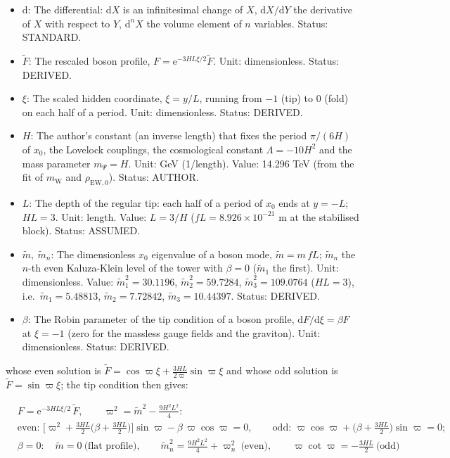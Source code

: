 \documentclass[
  10pt,
]{article}
\providecommand{\tightlist}{%
  \setlength{\itemsep}{0pt}\setlength{\parskip}{0pt}}
\begin{document}
\begin{itemize}
\tightlist
\item
  \(\mathrm{d}\): The differential: \(\mathrm{d}X\) is an infinitesimal
  change of \(X\), \(\mathrm{d}X/\mathrm{d}Y\) the derivative of \(X\)
  with respect to \(Y\), \(\mathrm{d}^nX\) the volume element of \(n\)
  variables. Status: STANDARD.
\item
  \(\tilde F\): The rescaled boson profile,
  \(F = \mathrm{e}^{-3HL\xi/2}\tilde F\). Unit: dimensionless. Status:
  DERIVED.
\item
  \(\xi\): The scaled hidden coordinate, \(\xi = y/L\), running from
  \(-1\) (tip) to \(0\) (fold) on each half of a period. Unit:
  dimensionless. Status: DERIVED.
\item
  \(H\): The author's constant (an inverse length) that fixes the period
  \(\pi/(6H)\) of \(x_0\), the Lovelock couplings, the cosmological
  constant \(\Lambda = -10H^2\) and the mass parameter \(m_\Psi = H\).
  Unit: GeV (1/length). Value: 14.296 TeV (from the fit of
  \(m_{\mathrm{W}}\) and \(\rho_{\mathrm{EW},0}\)). Status: AUTHOR.
\item
  \(L\): The depth of the regular tip: each half of a period of \(x_0\)
  ends at \(y = -L\); \(HL = 3\). Unit: length. Value: \(L = 3/H\)
  (\(fL = 8.926\times10^{-21}\) m at the stabilised block). Status:
  ASSUMED.
\item
  \(\tilde m,\ \tilde m_n\): The dimensionless \(x_0\) eigenvalue of a
  boson mode, \(\tilde m = m\,fL\); \(\tilde m_n\) the \(n\)-th even
  Kaluza-Klein level of the tower with \(\beta = 0\) (\(\tilde m_1\) the
  first). Unit: dimensionless. Value: \(\tilde m_1^2 = 30.1196\),
  \(\tilde m_2^2 = 59.7284\), \(\tilde m_3^2 = 109.0764\) (\(HL = 3\)),
  i.e.~\(\tilde m_1 = 5.48813\), \(\tilde m_2 = 7.72842\),
  \(\tilde m_3 = 10.44397\). Status: DERIVED.
\item
  \(\beta\): The Robin parameter of the tip condition of a boson
  profile, \(\mathrm{d}F/\mathrm{d}\xi = \beta F\) at \(\xi = -1\) (zero
  for the massless gauge fields and the graviton). Unit: dimensionless.
  Status: DERIVED.
\end{itemize}

whose even solution is
\(\tilde F = \cos\varpi\xi + \frac{3HL}{2\varpi}\sin\varpi\xi\) and
whose odd solution is \(\tilde F = \sin\varpi\xi\); the tip condition
then gives:

\[
\begin{aligned}
&F = \mathrm{e}^{-3HL\xi/2}\,\tilde F,\qquad \varpi^2 = \tilde m^2 - \frac{9H^2L^2}{4}:\\
&\text{even: }\Big[\varpi^2 + \frac{3HL}{2}\Big(\beta + \frac{3HL}{2}\Big)\Big]\sin\varpi -
 \beta\,\varpi\cos\varpi = 0,\qquad
 \text{odd: }\varpi\cos\varpi + \Big(\beta + \frac{3HL}{2}\Big)\sin\varpi = 0;\\
&\beta = 0:\quad \tilde m = 0\ \text{(flat profile)},\qquad \tilde m_n^2 = \frac{9H^2L^2}{4} +
 \varpi_n^2\ \text{(even)},\qquad
 \varpi\cot\varpi = -\frac{3HL}{2}\ \text{(odd)}
\end{aligned} \tag{FE-52}
\]
\end{document}
